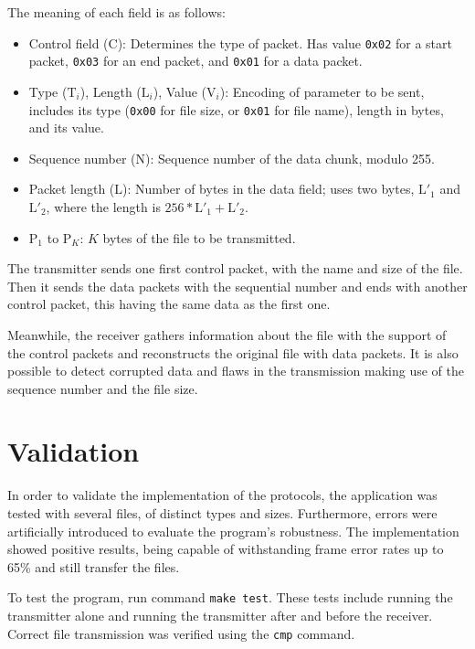 \documentclass[a4paper, 11pt]{report}
\begin{document}
The meaning of each field is as follows:
\begin{itemize}
	\itemsep0em
	\item Control field (C): Determines the type of packet. Has value \texttt{0x02} for a start packet, \texttt{0x03} for an end packet, and \texttt{0x01} for a data packet.
	\item Type ($\text{T}_i$), Length ($\text{L}_i$), Value ($\text{V}_i$): Encoding of parameter to be sent, includes its type (\texttt{0x00} for file size, or \texttt{0x01} for file name), length in bytes, and its value.
	\item Sequence number (N): Sequence number of the data chunk, modulo 255.
	\item Packet length ($\text{L}$): Number of bytes in the data field; uses two bytes, $\text{L}'_1$ and $\text{L}'_2$, where the length is $256*\text{L}'_1 + \text{L}'_2$.
	\item $\text{P}_1$ to $\text{P}_K$: $K$ bytes of the file to be transmitted.
\end{itemize}

The transmitter sends one first control packet, with the name and size of the file.
Then it sends the data packets with the sequential number and ends with another control packet,
this having the same data as the first one.

Meanwhile, the receiver gathers information about the file with the support of the control packets and reconstructs the original file with data packets. 
It is also possible to detect corrupted data and flaws in the transmission making use of the sequence number and the file size.

\section{Validation} \label{sec:Validation}

In order to validate the implementation of the protocols, the application was tested with several files, of distinct types and sizes. 
Furthermore, errors were artificially introduced to evaluate the program's robustness.
The implementation showed positive results, being capable of withstanding frame error rates up to 65\% and still transfer the files.

To test the program, run command \texttt{make test}.
These tests include running the transmitter alone and running the transmitter after and before the receiver.
Correct file transmission was verified using the \texttt{cmp} command.
\end{document}
